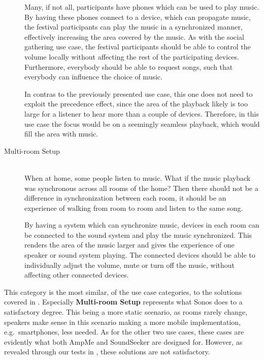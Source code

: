\begin{description}
        Many, if not all, participants have phones which can be used to play music.
        By having these phones connect to a device, which can propagate music,
        the festival participants can play the music in a synchronized manner,
        effectively increasing the area covered by the music.
        As with the social gathering use case,
        the festival participants should be able to control the volume locally without affecting the rest of the participating devices.
        Furthermore, everybody should be able to request songs, such that everybody can influence the choice of music.

        In contras to the previously presented use case, this one does not need to exploit the precedence effect, since the area of the playback likely is too large for a listener to hear more than a couple of devices.
        Therefore, in this use case the focus would be on a seemingly seamless playback, which would fill the area with music.

    \item[Multi-room Setup] \hfill\\
        When at home, some people listen to music.
        What if the music playback was synchronous across all rooms of the home?
        Then there should not be a difference in synchronization between each room,
        it should be an experience of walking from room to room and listen to the same song.

        By having a system which can synchronize music, devices in each room can be connected to the sound system and play the music synchronized.
        This renders the area of the music larger and gives the experience of one speaker or sound system playing.
        The connected devices should be able to individually adjust the volume, mute or turn off the music,
        without affecting other connected devices.
\end{description}

This category is the most similar, of the use case categories, to the solutions covered in .
Especially \textbf{Multi-room Setup} represents what Sonos does to a satisfactory degree.
This being a more static scenario, as rooms rarely change, speakers make sense in this scenario making a more mobile implementation, e.g.\ smartphones, less needed.
As for the other two use cases, these cases are evidently what both AmpMe and SoundSeeker are designed for.
However, as revealed through our tests in , these solutions are not satisfactory.

